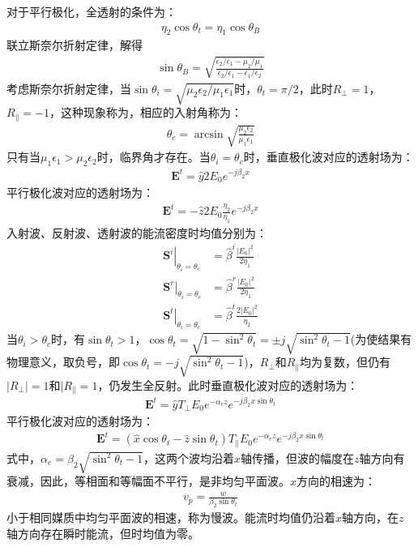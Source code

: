 \documentclass{article}
\numberwithin{equation}{section}
\begin{document}
对于平行极化，全透射的条件为：
\begin{align}
    \label{eq:eq439}
    \eta_2\cos\theta_t=\eta_1\cos\theta_B
\end{align}
联立斯奈尔折射定律，解得
\begin{align}
    \label{eq:eq440}
    \sin\theta_B=\sqrt{\frac{\epsilon_2/\epsilon_1-\mu_2/\mu_1}{\epsilon_2/\epsilon_1-\epsilon_1/\epsilon_2}}
\end{align}
考虑斯奈尔折射定律，当$\sin\theta_i=\sqrt{\mu_2\epsilon_2/\mu_1\epsilon_1}$时，$\theta_t=\pi/2$，此时$R_{\perp}=1$，$R_{\parallel}=-1$，这种现象称为\textbf{\color{blue}{全反射}}，相应的入射角称为\textbf{\color{blue}{临界角}}：
\begin{align}
    \label{eq:eq441}
    \theta_c=\arcsin\sqrt{\frac{\mu_2\epsilon_2}{\mu_1\epsilon_1}}
\end{align}
只有当$\mu_1\epsilon_1>\mu_2\epsilon_2$时，临界角才存在。当$\theta_i=\theta_c$时，垂直极化波对应的透射场为：
\begin{align}
    \label{eq:eq442}
    \mathbf{E}^t=\hat{y}2E_0e^{-j\beta_2x}
\end{align}
平行极化波对应的透射场为：
\begin{align}
    \label{eq:eq443}
    \mathbf{E}^t=-\hat{z}2E_0\frac{\eta_2}{\eta_1}e^{-j\beta_2x}
\end{align}
入射波、反射波、透射波的能流密度时均值分别为：
\begin{align}
    \label{eq:eq444}
    \left.\mathbf{S}^i\right|_{\theta_i=\theta_c}&=\hat{\beta}^i\frac{|E_0|^2}{2\eta_1} \\
    \label{eq:eq445}
    \left.\mathbf{S}^r\right|_{\theta_i=\theta_c}&=\hat{\beta}^r\frac{|E_0|^2}{2\eta_1} \\
    \label{eq:eq446}
    \left.\mathbf{S}^t\right|_{\theta_i=\theta_c}&=\hat{\beta}^t\frac{2|E_0|^2}{\eta_2}
\end{align}
当$\theta_i>\theta_c$时，有$\sin\theta_t>1$，$\cos\theta_t=\sqrt{1-\sin^2\theta_t}=\pm j\sqrt{\sin^2\theta_t-1}$(为使结果有物理意义，取负号，即$\cos\theta_t=-j\sqrt{\sin^2\theta_t-1}$)，$R_{\perp}$和$R_{\parallel}$均为复数，但仍有$|R_{\perp}|=1$和$|R_{\parallel}=1$，仍发生全反射。此时垂直极化波对应的透射场为：
\begin{align}
    \label{eq:eq447}
    \mathbf{E}^t=\hat{y}T_{\perp}E_0e^{-\alpha_ez}e^{-j\beta_2x\sin\theta_t}
\end{align}
平行极化波对应的透射场为：
\begin{align}
    \label{eq:eq448}
    \mathbf{E}^t=(\hat{x}\cos\theta_t-\hat{z}\sin\theta_t)T_{\parallel}E_0e^{-\alpha_ez}e^{-j\beta_2x\sin\theta_t}
\end{align}
式中，$\alpha_e=\beta_2\sqrt{\sin^2\theta_t-1}$，这两个波均沿着$x$轴传播，但波的幅度在$z$轴方向有衰减，因此，等相面和等幅面不平行，是非均匀平面波。$x$方向的相速为：
\begin{align}
    \label{eq:eq449}
    v_p=\frac{w}{\beta_2\sin\theta_t}
\end{align}
小于相同媒质中均匀平面波的相速，称为慢波。能流时均值仍沿着$x$轴方向，在$z$轴方向存在瞬时能流，但时均值为零。
\end{document}
